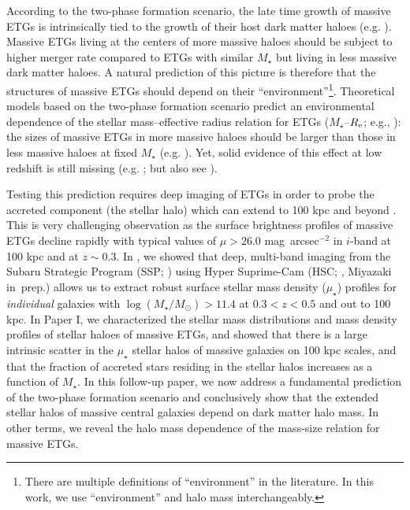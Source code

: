 \documentclass[a4paper,fleqn,usenatbib]{mnras}
\def\sb{mag~arcsec$^{-2}$}
\def\mstar{{$M_{\star}$}}
\def\logms{{$\log (M_{\star}/M_{\odot})$}}
\def\mden{{$\mu_{\star}$}}
\begin{document}
    According to the two-phase formation scenario, the late time growth of massive 
    ETGs is intrinsically tied to the growth of their host dark matter haloes 
    (e.g. \citealt{Leauthaud2012, Behroozi2013, Shankar2013}). 
    Massive ETGs living at the centers of more massive haloes should be subject to 
    higher merger rate compared to ETGs with similar \mstar{} but living in less 
    massive dark matter haloes. 
    A natural prediction of this picture is therefore that the structures of 
    massive ETGs should depend on their ``environment''\footnote{There are 
    multiple definitions of ``environment'' in the literature.  
    In this work, we use ``environment'' and halo mass interchangeably.}.
    Theoretical models based on the two-phase formation scenario predict an 
    environmental dependence of the stellar mass--effective radius relation for 
    ETGs (\mstar{}--$R_{\rm e}$; 
    e.g., \citealt{Shen2003, Guo2009}): the sizes of massive ETGs in more massive 
    haloes should be larger than those in less massive haloes at fixed \mstar{} 
    (e.g. \citealt{Shankar2013, Shankar2014}). 
    Yet, solid evidence of this effect at low redshift is still missing 
    (e.g. \citealt{Nair2010, HCompany13}; but also see \citealt{Yoon2017}).
    
    
	
    Testing this prediction requires deep imaging of ETGs in order to probe the 
    accreted component (the stellar halo) which can extend to 100 kpc and 
    beyond \citep[eg.,][]{hscMassiveI}. 
    This is very challenging observation as the surface brightness profiles of 
    massive ETGs decline rapidly with typical values of $\mu > 26.0$ \sb{} in 
    $i$-band at 100 kpc and at $z\sim0.3$. 
    In \citet[][Paper I hereafter]{hscMassiveI}, we showed that deep, 
    multi-band imaging from the Subaru Strategic Program (SSP; \citealt{HSC-SSP,
    HSC-DR1}) using Hyper Suprime-Cam (HSC; \citealt{Miyazaki2012}, 
    Miyazaki in~prep.) allows us to extract robust surface stellar
    mass density (\mden{}) profiles for {\it individual} galaxies with 
    \logms{}$>11.4$ at $0.3 < z < 0.5$ and out to 100 kpc. 
    In Paper I, we characterized the stellar mass distributions and mass density 
    profiles of stellar haloes of massive ETGs, and showed that there is a large 
    intrinsic scatter in the \mden{} stellar halos of massive galaxies on 100 kpc 
    scales, and that the fraction of accreted stars residing in the stellar halos 
    increases as a function of \mstar{}. 
    In this follow-up paper, we now address a fundamental prediction of the 
    two-phase formation scenario and conclusively show that the extended stellar 
    halos of massive central galaxies depend on dark matter halo mass. 
    In other terms, we reveal the halo mass dependence of the mass-size relation 
    for massive ETGs.   
    
\end{document}

